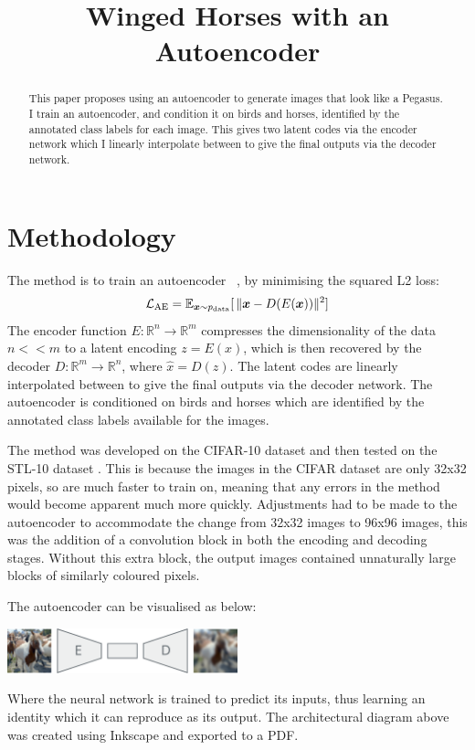 \documentclass{article}
\title{Winged Horses with an Autoencoder}
\begin{document}
\maketitle
\begin{abstract}
    This paper proposes using an autoencoder to generate images that look like a Pegasus. 
    I train an autoencoder, and condition it on birds and horses, identified by the annotated class labels for each image. 
    This gives two latent codes via the encoder network which I linearly interpolate between to give the final outputs 
    via the decoder network. 
\end{abstract}

\section{Methodology}
The method is to train an autoencoder ~\cite{kramer1991nonlinear}, by minimising the squared L2 loss:
\begin{equation}
    \mathcal{L}_{\textrm{AE}} = \mathbb{E}_{{\bm{x}}\sim p_{\textrm{data}}}[\, \lVert {\bm{x}} - D(E({\bm{x}})) \rVert^2 ]
\end{equation}
The encoder function $E : \mathbb{R}^n \rightarrow\mathbb{R}^m$ compresses the dimensionality of the data $n << m$ to a latent encoding 
$z = E(x)$, which is then recovered by the decoder $D: \mathbb{R}^m \rightarrow \mathbb{R}^n$, where $\hat{x} = D(z)$. 
The latent codes are linearly interpolated between to give the final outputs via the decoder network. 
The autoencoder is conditioned on birds and horses which are identified by the annotated class labels available for the images. 

The method was developed on the CIFAR-10 dataset \cite{krizhevsky2009learning} and then tested on the STL-10 dataset \cite{pmlr-v15-coates11a}. 
This is because the images in the CIFAR dataset are only 32x32 pixels, so are much faster to train on, meaning that any errors in the 
method would become apparent much more quickly. 
Adjustments had to be made to the autoencoder to accommodate the change from 32x32 images to 96x96 images, this was the addition of a
convolution block in both the encoding and decoding stages. 
Without this extra block, the output images contained unnaturally large blocks of similarly coloured pixels. 

The autoencoder can be visualised as below: 
\begin{center}
    \includegraphics[width=0.5\textwidth]{figures/architecture.pdf}
\end{center}
Where the neural network is trained to predict its inputs, thus learning an identity which it can reproduce as its output. 
The architectural diagram above was created using Inkscape and exported to a PDF. 
\end{document}
